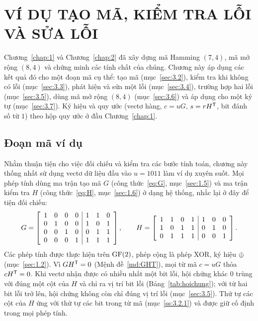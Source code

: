 %
\chapter{VÍ DỤ TẠO MÃ, KIỂM TRA LỖI VÀ SỬA LỖI}
\label{chap:3}

Chương~\ref{chap:1} và Chương~\ref{chap:2} đã xây dựng mã Hamming $(7,4)$, mã mở
rộng $(8,4)$ và chứng minh các tính chất của chúng. Chương này áp dụng các kết
quả đó cho một đoạn mã cụ thể: tạo mã (mục~\ref{sec:3.2}), kiểm tra khi không có
lỗi (mục~\ref{sec:3.3}), phát hiện và sửa một lỗi (mục~\ref{sec:3.4}), trường
hợp hai lỗi (mục~\ref{sec:3.5}), dùng mã mở rộng $(8,4)$ (mục~\ref{sec:3.6}) và
áp dụng cho một ký tự (mục~\ref{sec:3.7}). Ký hiệu và quy ước (vectơ hàng,
$c = uG$, $s = rH^{\mathsf{T}}$, bit đánh số từ $1$) theo hộp quy ước ở đầu
Chương~\ref{chap:1}.

\section{Đoạn mã ví dụ}
\label{sec:3.1}

Nhằm thuận tiện cho việc đối chiếu và kiểm tra các bước tính toán, chương này
thống nhất sử dụng vectơ dữ liệu đầu vào $u = 1011$ làm ví dụ xuyên suốt. Mọi
phép tính dùng ma trận tạo mã $G$ (công thức~\eqref{eq:G}, mục~\ref{sec:1.5}) và
ma trận kiểm tra $H$ (công thức~\eqref{eq:H}, mục~\ref{sec:1.6}) ở dạng hệ
thống, nhắc lại ở đây để tiện đối chiếu:
\[
  G = \left[\begin{array}{cccc|ccc} 1 & 0 & 0 & 0 & 1 & 1 & 0\\ 0 & 1 & 0 & 0 & 1 & 0 & 1\\ 0 & 0 & 1 & 0 & 0 & 1 & 1\\ 0 & 0 & 0 & 1 & 1 & 1 & 1 \end{array}\right] , \qquad H = \left[\begin{array}{cccc|ccc} 1 & 1 & 0 & 1 & 1 & 0 & 0\\ 1 & 0 & 1 & 1 & 0 & 1 & 0\\ 0 & 1 & 1 & 1 & 0 & 0 & 1 \end{array}\right] .
\]
Các phép tính được thực hiện trên $\mathrm{GF}(2)$, phép cộng là phép XOR, ký hiệu $\oplus$
(mục~\ref{sec:1.2}). Vì $GH^{\mathsf{T}} = 0$ (Mệnh đề~\ref{md:GHT}), mọi từ mã $c = uG$
thỏa $cH^{\mathsf{T}} = 0$. Khi vectơ nhận được có nhiều nhất một bit lỗi, hội chứng khác
$0$ trùng với đúng một cột của $H$ và chỉ ra vị trí bit lỗi
(Bảng~\ref{tab:hoichung}); với từ hai bit lỗi trở lên, hội chứng không còn chỉ
đúng vị trí lỗi (mục~\ref{sec:3.5}). Thứ tự các cột của $H$ ứng với thứ tự các
bit trong từ mã (mục~\ref{ss:3.2.1}) và được giữ cố định trong mọi phép tính.

